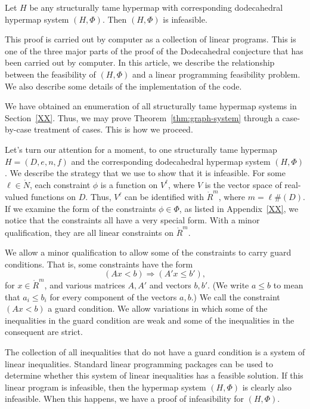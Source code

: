 \begin{theorem}\label{thm:graph-system}  Let 
$H$ be any structurally tame hypermap with corresponding
dodecahedral hypermap system $(H,\Phi)$.  Then $(H,\Phi)$ is infeasible.
\end{theorem}

This proof is carried out by computer as a collection of linear
programs.  This is one of the three major parts of the proof
of the Dodecahedral conjecture that has been carried out by computer.
In this article, we describe the relationship between the
feasibility of $(H,\Phi)$ and a linear programming feasibility
problem.  We also describe some details of the implementation of 
the code.

We have obtained an enumeration of all structurally tame
hypermap systems in Section~\ref{XX}.  Thus,  we may prove
Theorem~\ref{thm:graph-system} through a case-by-case treatment
of cases.  This is how we proceed.

Let's turn our attention for a moment, to one structurally tame hypermap $H=(D,e,n,f)$ and the corresponding dodecahedral hypermap system $(H,\Phi)$.
We describe the strategy that we use to show that it is infeasible.
For some $\ell\in\ring{N}$,
each constraint $\phi$ is a function on $V^\ell$, where $V$ is
the vector space of real-valued functions on $D$.  Thus,
$V^\ell$ can be identified with $\ring{R}^m$, where $m= \ell \#(D)$.
If we examine the form of the constraints $\phi\in \Phi$, as listed
in Appendix~\ref{XX}, we notice that the constraints all have a 
very special form.  With a minor qualification, they are all linear constraints
on $\ring{R}^m$.  

We allow a minor qualification to allow some of the constraints
to carry guard conditions.  That is, some constraints have the form
  \begin{equation}\label{eqn:guard}
  (A x < b)  \Rightarrow (A' x \le b'),
  \end{equation}
for $x\in\ring{R}^m$, and various matrices $A,A'$ and vectors
$b,b'$.  (We write $a \le b$ to mean
that $a_i\le b_i$ for every component of the vectors $a,b$.)
We call the constraint $(A x < b)$ a guard condition.
We allow variations in which some of the inequalities in the
guard condition are weak and some of the inequalities in the
consequent are strict.

The collection of all inequalities that do not have a guard 
condition is a system of linear inequalities.  Standard linear
programming packages can be used to determine whether this
system of linear inequalities has a feasible solution.  If this
linear program is infeasible, then the hypermap system $(H,\Phi)$
is clearly also infeasible.  When this happens, we have a
proof of infeasibility for $(H,\Phi)$.

